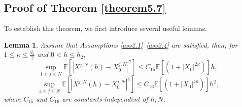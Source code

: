 \documentclass[12pt]{article}
\numberwithin{equation}{section}
\newtheorem{lemma}[assumption]{Lemma}
\begin{document}
\subsection{Proof of Theorem \ref{theorem5.7}}
To establish this theorem, we first introduce several useful lemmas.
\begin{lemma}\label{lemma5.4}
  Assume that  Assumptions \ref{ass2.1}--\ref{ass2.4} are satisfied, then, for $1 \leq\kappa\leq \tfrac{q_0}{2}$ and $0<h \leq h_2$,
\begin{equation}\tag{5.85}\label{5.56}
\underset{1\leqslant j\leqslant N}{\sup}\mathbb{E}\left[\left|X^{j,N}\left(h\right)-X^{j,N}_0\right|^{2}\right] \leq C_{15} \mathbb{E}\left[\left(1+\left|X_0\right|^{2 \kappa }\right)\right] h ,
\end{equation}
\begin{equation}\tag{5.86}\label{5.57}
\underset{1\leqslant j\leqslant N}{\sup}\mathbb{E}\left[\left|X^{j,N}\left(h\right)-X^{j,N}_0\right|^{4}\right] \leq C_{16} \mathbb{E}\left[\left(1+\left|X_0\right|^{4 \kappa }\right)\right] h^2 ,
\end{equation}
where $C_{15}$ and $C_{16}$ are constants independent of $h, N$.
\end{lemma}
\end{document}
